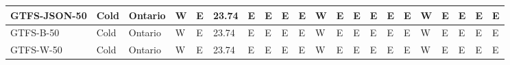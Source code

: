 \begin{table}[]
{\begin{tabular}{|l|l|l|l|l|l|l|l|l|l|l|l|l|l|l|l|l|l|l|l|l|}
GTFS-JSON-50                                            & Cold                   & Ontario        & W           & E           & 23.74       & E           & E           & E           & E           & W           & E           & E            & E            & E            & E            & W            & E            & E            & E            & E            \\ \hline
GTFS-B-50                                               & Cold                   & Ontario        & W           & E           & 23.74       & E           & E           & E           & E           & W           & E           & E            & E            & E            & E            & W            & E            & E            & E            & E            \\ \hline
GTFS-W-50                                               & Cold                   & Ontario        & W           & E           & 23.74       & E           & E           & E           & E           & W           & E           & E            & E            & E            & E            & W            & E            & E            & E            & E            \\ \hline
\end{tabular}%
}
\end{table}


